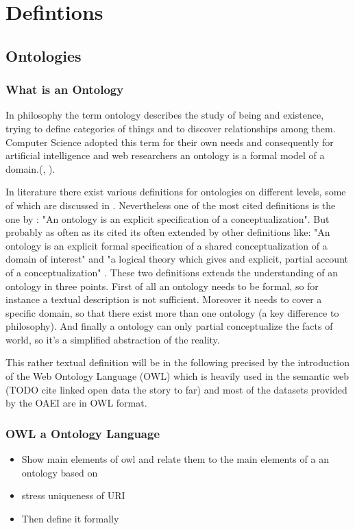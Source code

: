 \documentclass[11pt,titlepage,oneside,openany,a4paper]{report}
\begin{document}
	\section{Defintions}
	\label{sec:defintions}

	\subsection{Ontologies}
	\label{sec:ontologies_def}
	\subsubsection{What is an Ontology}
In philosophy the term ontology describes the study of being and existence, trying to define categories of things and to discover relationships among them. Computer Science adopted this term for their own needs and consequently for artificial intelligence  and web researchers an ontology is a formal model of a domain.(\cite{ehrig2006ontology}, \cite{paulheim2011ontology}). 

In literature there exist various definitions for ontologies on different levels, some of which are discussed in \cite{Guarino:1997}. Nevertheless one of the most cited definitions is the one by \cite{Gruber:1995}: "An ontology is an explicit specification  of a conceptualization".  But probably as often as its cited its often extended by other definitions like: "An ontology is an explicit formal specification of a shared conceptualization of a domain of interest"\cite{Studer:1998} and "a logical theory which gives and explicit, partial account of a conceptualization" \cite{Guarino95}. These two definitions extends the understanding of an ontology in three points. First of all an ontology needs to be formal, so for instance a textual description is not sufficient.\cite{Studer:1998} Moreover it needs to cover a specific domain, so that there exist more than one ontology (a key difference to philosophy). And finally a ontology can only partial conceptualize the facts of world, so it's a simplified abstraction of the reality.\cite{ehrig2006ontology}

This rather textual definition will be in the following precised by the introduction of the Web Ontology Language (OWL) which is  heavily used in the semantic web (TODO cite linked open data the story to far) and most of the datasets provided by the OAEI are in OWL format. \cite{dragisicresults}
\subsubsection{OWL a Ontology Language}
\begin{itemize}
\item Show main elements of owl and relate them to the main elements of a an ontology based on \cite{euzenat2013d}
\item stress uniqueness of URI
\item Then define it formally
\end{itemize}
\end{document}

